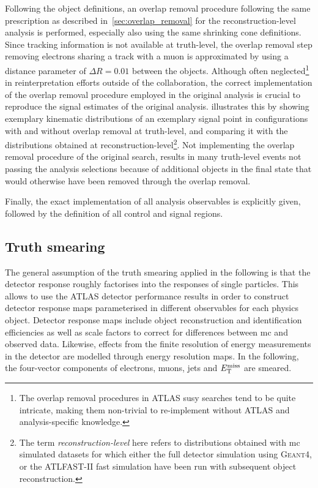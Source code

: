 Following the object definitions, an overlap removal procedure following the same prescription as described in~\cref{sec:overlap_removal} for the reconstruction-level analysis is performed, \ie especially also using the same shrinking cone definitions.
Since tracking information is not available at truth-level, the overlap removal step removing electrons sharing a track with a muon is approximated by using a distance parameter of $\Delta R = 0.01$ between the objects.
Although often neglected\footnote{The overlap removal procedures in ATLAS \gls{susy} searches tend to be quite intricate, making them non-trivial to re-implement without ATLAS and analysis-specific knowledge.} in reinterpretation efforts outside of the collaboration, the correct implementation of the overlap removal procedure employed in the original analysis is crucial to reproduce the signal estimates of the original analysis.
 illustrates this by showing exemplary kinematic distributions of an exemplary signal point in configurations with and without overlap removal at truth-level, and comparing it with the distributions obtained at reconstruction-level\footnote{The term \textit{reconstruction-level} here refers to distributions obtained with \gls{mc} simulated datasets for which either the full detector simulation using \textsc{Geant4}, or the \textsc{ATLFAST-II} fast simulation have been run with subsequent object reconstruction.}.
Not implementing the overlap removal procedure of the original \onelepton search, results in many truth-level events not passing the analysis selections because of additional objects in the final state that would otherwise have been removed through the overlap removal. 

Finally, the exact implementation of all analysis observables is explicitly given, followed by the definition of all control and signal regions.

\subsection{Truth smearing}\label{sec:truth_smearing}

The general assumption of the truth smearing applied in the following is that the detector response roughly factorises into the responses of single particles.
This allows to use the ATLAS detector performance results in order to construct detector response maps parameterised in different observables for each physics object.
Detector response maps include object reconstruction and identification efficiencies as well as scale factors to correct for differences between \gls{mc} and observed data.
Likewise, effects from the finite resolution of energy measurements in the detector are modelled through energy resolution maps. In the following, the four-vector components of electrons, muons, jets and $E_{\textrm{T}}^{\textrm{miss}}$ are smeared. 

